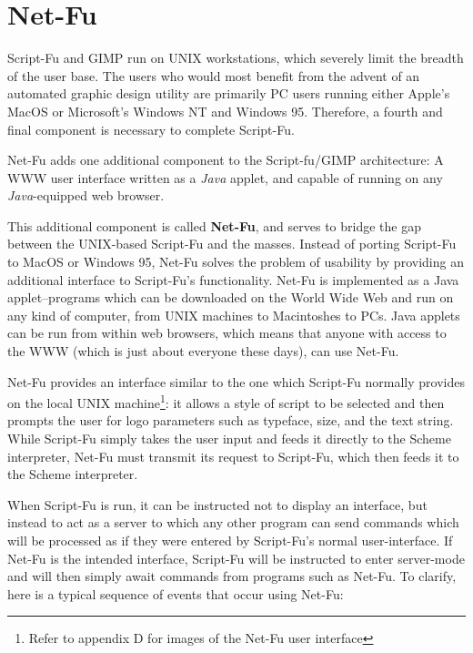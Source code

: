 \documentclass{article}
\makeatletter
\newcommand{\myfigone}[3]{
	\def\@captype{figure}
	\begin{table}
	\bigskip
        \begin{center}
	\leavevmode
	\epsfysize=#2 \epsfbox{#1.eps}
	\caption{#3} \label{#1}
	\end{center}
	\end{table}}
\makeatother
\begin{document}
\section{Net-Fu}

Script-Fu and GIMP run on UNIX workstations, which severely limit the
breadth of the user base.  The users who would most benefit from the
advent of an automated graphic design utility are primarily PC users
running either Apple's MacOS or Microsoft's Windows NT and Windows 95.
Therefore, a fourth and final component is necessary to complete
Script-Fu.

\myfigone{net-fu}{6cm}{Net-Fu adds one additional component to the
Script-fu/GIMP architecture: A WWW user interface written as a {\it
Java} applet, and capable of running on any {\it Java}-equipped web browser.}

This additional component is called {\bf Net-Fu}, and serves to bridge
the gap between the UNIX-based Script-Fu and the masses.  Instead of
porting Script-Fu to MacOS or Windows 95, Net-Fu solves the problem of
usability by providing an additional interface to Script-Fu's
functionality.  Net-Fu is implemented as a Java applet--programs which
can be downloaded on the World Wide Web and run on any kind of
computer, from UNIX machines to Macintoshes to PCs.  Java applets can
be run from within web browsers, which means that anyone with access
to the WWW (which is just about everyone these days), can use Net-Fu.

Net-Fu provides an interface similar to the one which Script-Fu
normally provides on the local UNIX machine\footnote{Refer to appendix
D for images of the Net-Fu user interface}: it allows a style of
script to be selected and then prompts the user for logo parameters
such as typeface, size, and the text string.  While Script-Fu simply
takes the user input and feeds it directly to the Scheme interpreter,
Net-Fu must transmit its request to Script-Fu, which then feeds it to
the Scheme interpreter.

When Script-Fu is run, it can be instructed not to display an
interface, but instead to act as a server to which any other program
can send commands which will be processed as if they were entered by
Script-Fu's normal user-interface.  If Net-Fu is the intended
interface, Script-Fu will be instructed to enter server-mode and will
then simply await commands from programs such as Net-Fu.  To clarify,
here is a typical sequence of events that occur using Net-Fu:
\end{document}
